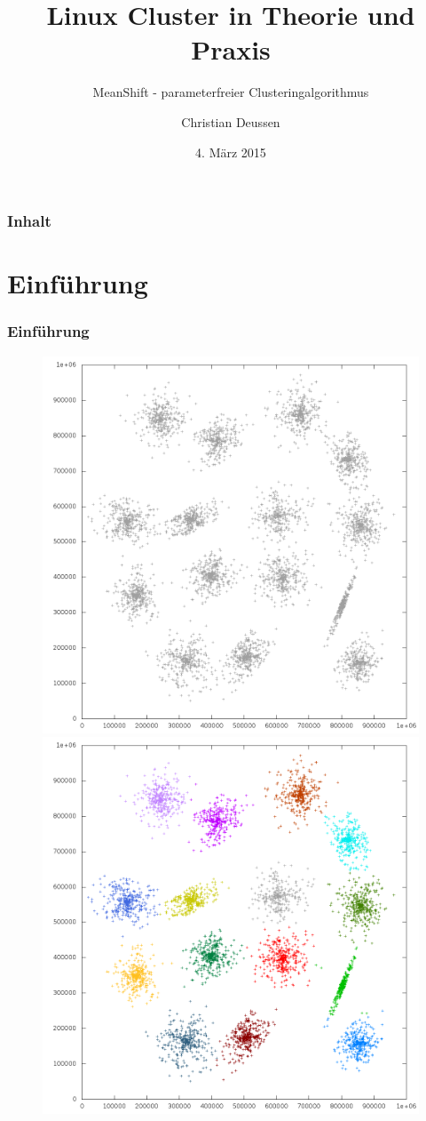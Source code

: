\documentclass[10pt,utf8]{beamer}
\title{Linux Cluster in Theorie und Praxis}
\subtitle{MeanShift - parameterfreier Clusteringalgorithmus}
\author{Christian Deussen}
\date{4. M\"arz 2015}
\institute[ZIH TUD]{Zentrum f\"ur Informationsdienste und Hochleistungsrechnen -- TU Dresden}
\begin{document}
\zihmaketitle

\begin{frame}
\frametitle{Inhalt}
	\tableofcontents
\end{frame}
\Large

\section{Einführung}
\begin{frame}
	\frametitle{Einf\"uhrung}
		\centering
		\begin{figure}[p!]
			\vspace{-10pt}
			\hspace{-25pt}
			\includegraphics[scale=0.23, keepaspectratio]{../output/pics/s1_black.png}
			\includegraphics[scale=0.23, keepaspectratio]{../output/pics/s1_colored.png}

\end{figure}
\end{frame}
\end{document}
